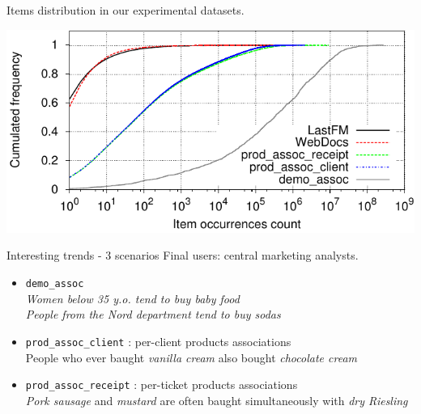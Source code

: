 \documentclass[table]{beamer}
\providecommand{\demoassoc}{\texttt{demo\-\_assoc} }
\providecommand{\prodassocreceipt}{\texttt{prod\-\_assoc\-\_receipt} }
\providecommand{\prodassocclient}{\texttt{prod\-\_assoc\-\_client} }
\begin{document}
\begin{frame}{Items distribution in our experimental datasets.}
  \begin{center}
    \includegraphics[width=\linewidth]{../fig/itemFreqCumulativeDist/itemFreqCumulativeDistributions.pdf}
  \end{center}
\end{frame}


\begin{frame}{Interesting trends - 3 scenarios}
  Final users: central marketing analysts.\\
  \begin{itemize}
    \item \demoassoc \\
      {\em  Women below 35 y.o. tend to buy baby food}\\
      {\em  People from the {\em Nord} department tend to buy sodas}
    \item \prodassocclient: per-client products associations \\
      People who ever baught {\em vanilla cream} also bought {\em chocolate cream}
    \item \prodassocreceipt: per-ticket products associations\\
      {\em Pork sausage} and {\em mustard} are often baught simultaneously with {\em dry Riesling}
\end{itemize}
\end{frame}
\end{document}
